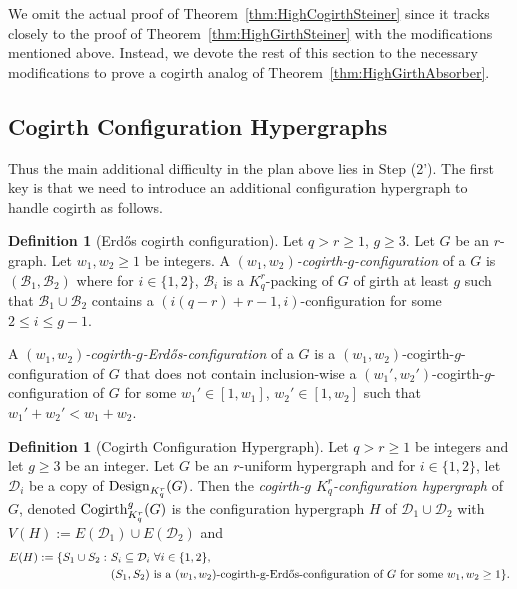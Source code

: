 \documentclass[11pt]{article}
\newcommand{\mc}[1]{\mathcal{#1}}
\newcounter{i}
\theoremstyle{plain}
\theoremstyle{plain} %
\theoremstyle{definition}
\newtheorem{definition}[thm]{Definition}
\begin{document}
We omit the actual proof of Theorem~\ref{thm:HighCogirthSteiner} since it tracks closely to the proof of Theorem~\ref{thm:HighGirthSteiner} with the modifications mentioned above. Instead, we devote the rest of this section to the necessary modifications to prove a cogirth analog of Theorem~\ref{thm:HighGirthAbsorber}.

\subsection{Cogirth Configuration Hypergraphs}

Thus the main additional difficulty in the plan above lies in Step (2'). The first key is that we need to introduce an additional configuration hypergraph to handle cogirth as follows.

\begin{definition}[Erd\H{o}s cogirth configuration]
Let $q>r\ge 1$, $g\ge 3$. Let $G$ be an $r$-graph. Let $w_1,w_2\ge 1$ be integers. A \emph{$(w_1,w_2)$-cogirth-$g$-configuration} of a $G$ is $(\mc{B}_1, \mc{B}_2)$ where for $i\in \{1,2\}$, $\mc{B}_i$ is a $K_q^r$-packing of $G$ of girth at least $g$ such that $\mc{B}_1\cup \mc{B}_2$ contains a $(i(q-r)+r-1,i)$-configuration for some $2\le i \le g-1$.

A \emph{$(w_1,w_2)$-cogirth-$g$-Erd\H{o}s-configuration} of a $G$ is a $(w_1,w_2)$-cogirth-$g$-configuration of $G$ that does not contain inclusion-wise a $(w_1',w_2')$-cogirth-$g$-configuration of $G$ for some $w_1'\in [1,w_1]$, $w_2'\in [1,w_2]$ such that $w_1'+w_2' < w_1+w_2$.
\end{definition}

\begin{definition}[Cogirth Configuration Hypergraph]
Let $q> r\ge 1$ be integers and let $g\ge 3$ be an integer. Let $G$ be an $r$-uniform hypergraph and for $i\in \{1,2\}$, let $\mathcal{D}_i$ be a copy of ${\rm Design}_{K_q^r}(G)$. %
Then the \emph{cogirth-$g$ $K_q^r$-configuration hypergraph} of $G$, denoted ${\rm Cogirth}_{K_q^r}^g(G)$ is the configuration hypergraph $H$ of $\mathcal{D}_1\cup \mc{D}_2$ with $V(H):=E(\mc{D}_1)\cup E(\mc{D}_2)$ and \begin{align*}
E(H) := \{S_1\cup S_2:~&S_i\subseteq \mc{D}_i~\forall i\in\{1,2\}, \\
&(S_1, S_2) \text{ is a $(w_1,w_2)$-cogirth-g-Erd\H{o}s-configuration of } G \text{ for some $w_1,w_2\ge 1$}\}.    
\end{align*}
\end{definition}
\end{document}
